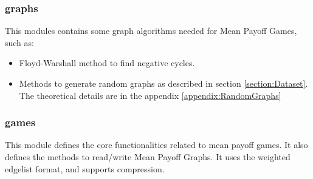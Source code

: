 \subsubsection{graphs}
This modules contains some graph algorithms needed for Mean Payoff Games, such as:
\begin{itemize}
	\item Floyd-Warshall method to find negative cycles.
	\item Methods to generate random graphs as described in section \ref{section:Dataset}. The theoretical details are in the appendix \ref{appendix:RandomGraphs}
\end{itemize}
\subsubsection{games}
This module defines the core functionalities related to mean payoff games.
\newline It also defines the methods to read/write Mean Payoff Graphs. It uses the weighted edgelist format, and supports compression.  
